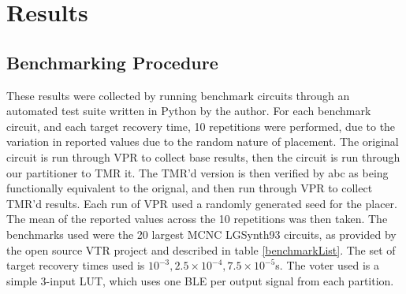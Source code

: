 \documentclass[12pt,final,oneside]{dwThesis} %
\begin{document}
   \chapter{Results}
   \section{Benchmarking Procedure}
   These results were collected by running benchmark circuits through an automated test suite written in Python by the author. For each benchmark circuit, and each target recovery time, 10 repetitions were performed, due to the variation in reported values due to the random nature of placement.
   The original circuit is run through VPR to collect base results, then the circuit is run through our partitioner to TMR it. The TMR'd version is then verified by abc as being functionally equivalent to the orignal, and then run through VPR to collect TMR'd results. Each run of VPR used a randomly generated seed for the placer.
   The mean of the reported values across the 10 repetitions was then taken.
   The benchmarks used were the 20 largest MCNC LGSynth93 circuits, as provided by the open source VTR project  and described in table \ref{benchmarkList}.
   The set of target recovery times used is $10^{-3}, 2.5\times10^{-4}, 7.5\times10^{-5}$s.
   The voter used is a simple 3-input \ac{LUT}, which uses one \ac{BLE} per output signal from each partition.
\end{document}
